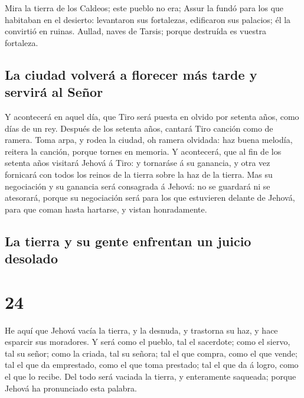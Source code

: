  Mira la tierra de los Caldeos; este pueblo no era; Assur
la fundó para los que habitaban en el desierto: levantaron sus
fortalezas, edificaron sus palacios; él la convirtió en ruinas.
 Aullad, naves de Tarsis; porque destruída es vuestra
fortaleza.

\hypertarget{la-ciudad-volveruxe1-a-florecer-muxe1s-tarde-y-serviruxe1-al-seuxf1or}{%
\subsection{La ciudad volverá a florecer más tarde y servirá al
Señor}\label{la-ciudad-volveruxe1-a-florecer-muxe1s-tarde-y-serviruxe1-al-seuxf1or}}

 Y acontecerá en aquel día, que Tiro será puesta en
olvido por setenta años, como días de un rey. Después de los setenta
años, cantará Tiro canción como de ramera.  Toma arpa, y
rodea la ciudad, oh ramera olvidada: haz buena melodía, reitera la
canción, porque tornes en memoria.  Y acontecerá, que al
fin de los setenta años visitará Jehová á Tiro: y tornaráse á su
ganancia, y otra vez fornicará con todos los reinos de la tierra sobre
la haz de la tierra.  Mas su negociación y su ganancia
será consagrada á Jehová: no se guardará ni se atesorará, porque su
negociación será para los que estuvieren delante de Jehová, para que
coman hasta hartarse, y vistan honradamente.

\hypertarget{la-tierra-y-su-gente-enfrentan-un-juicio-desolado}{%
\subsection{La tierra y su gente enfrentan un juicio
desolado}\label{la-tierra-y-su-gente-enfrentan-un-juicio-desolado}}

\hypertarget{section-23}{%
\section{24}\label{section-23}}

 He aquí que Jehová vacía la tierra, y la desnuda, y
trastorna su haz, y hace esparcir sus moradores.  Y será
como el pueblo, tal el sacerdote; como el siervo, tal su señor; como la
criada, tal su señora; tal el que compra, como el que vende; tal el que
da emprestado, como el que toma prestado; tal el que da á logro, como el
que lo recibe.  Del todo será vaciada la tierra, y
enteramente saqueada; porque Jehová ha pronunciado esta palabra.

